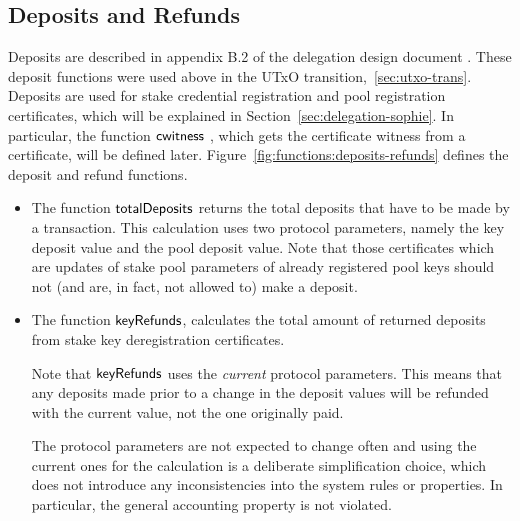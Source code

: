 \clearpage

\subsection{Deposits and Refunds}
\label{sec:deps-refunds}

Deposits are described in appendix B.2 of the delegation design document
\cite{delegation_design}.  These deposit functions were used above in the UTxO
transition,~\ref{sec:utxo-trans}. Deposits are used for stake credential
registration and pool registration certificates, which will be explained in
Section~\ref{sec:delegation-sophie}.  In particular, the function
$\mathsf{cwitness}~ \mathit{}$, which gets the certificate witness from a certificate, will be
defined later.  Figure~\ref{fig:functions:deposits-refunds} defines the deposit
and refund functions.
\begin{itemize}
  \item The function $\mathsf{totalDeposits}$ returns the total deposits that have to be
    made by a transaction.  This calculation uses two protocol parameters, namely
    the key deposit value and the pool deposit value.
    Note that those certificates which are
    updates of stake pool parameters of already registered pool keys should not
    (and are, in fact, not allowed to) make a deposit.
  \item The function $\mathsf{keyRefunds}$, calculates the total amount of returned
    deposits from stake key deregistration certificates.

    Note that $\mathsf{keyRefunds}$ uses the \textit{current} protocol parameters.
    This means that any deposits made prior to a change in the deposit values
    will be refunded with the current value, not the one originally paid.

    The protocol parameters are not
    expected to change often and using the current ones for the calculation
    is a deliberate simplification choice, which does not introduce any inconsistencies
    into the system rules or properties. In particular, the general accounting
    property is not violated.
\end{itemize}

